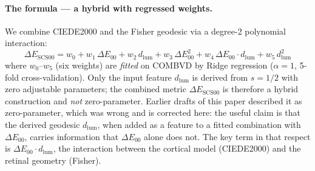 \documentclass[12pt,a4paper]{article}
\begin{document}
\paragraph{The formula --- a hybrid with regressed weights.}
We combine CIEDE2000 and the Fisher geodesic via a degree-2
polynomial interaction:
\begin{equation}
  \Delta E_{\mathrm{SCS00}}
  = w_0 + w_1\,\Delta E_{00}
  + w_2\,d_{\mathrm{lum}}
  + w_3\,\Delta E_{00}^2
  + w_4\,\Delta E_{00}\cdot d_{\mathrm{lum}}
  + w_5\,d_{\mathrm{lum}}^2
  \label{eq:sct00}
\end{equation}
where $w_0$--$w_5$ (six weights) are \emph{fitted} on COMBVD by
Ridge regression ($\alpha = 1$, 5-fold cross-validation). Only the
input feature $d_{\mathrm{lum}}$ is derived from $s = 1/2$ with zero
adjustable parameters; the combined metric
$\Delta E_{\mathrm{SCS00}}$ is therefore a hybrid construction and
\emph{not} zero-parameter. Earlier drafts of this paper described it
as zero-parameter, which was wrong and is corrected here: the useful
claim is that the derived geodesic $d_{\mathrm{lum}}$, when added as a
feature to a fitted combination with $\Delta E_{00}$, carries
information that $\Delta E_{00}$ alone does not. The key term in that
respect is $\Delta E_{00} \cdot d_{\mathrm{lum}}$, the interaction
between the cortical model (CIEDE2000) and the retinal geometry
(Fisher).
\end{document}
